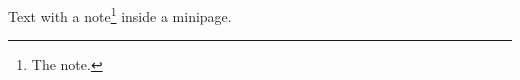 \documentclass[12pt]{article}
\begin{document}
\begin{minipage}{6cm}Text with a note\footnote{The note.} inside a minipage.\end{minipage}
\end{document}
